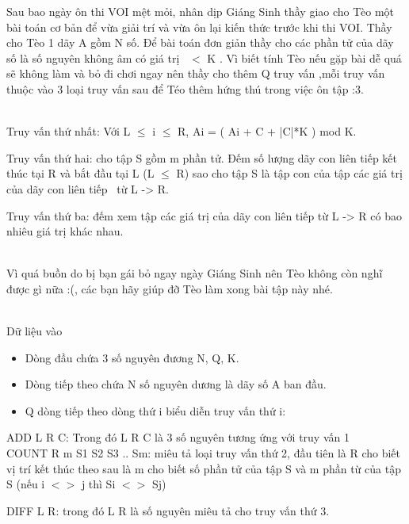 







     Sau bao ngày ôn thi VOI mệt mỏi, nhân dịp Giáng Sinh thầy giao cho Tèo một bài toán cơ bản để vừa giải trí và vừa ôn lại kiến thức trước khi thi VOI. Thầy cho Tèo 1 dãy A gồm N số. Để bài toán đơn giản thầy cho các phần tử của dãy số là số nguyên không âm có giá trị  $<$ K . Vì biết tính Tèo nếu gặp bài dễ quá sẽ không làm và bỏ đi chơi ngay nên thầy cho thêm Q truy vấn ,mỗi truy vấn thuộc vào 3 loại truy vấn sau để Téo thêm hứng thú trong việc ôn tập :3.    


\\

     Truy vấn thứ nhất: Với L  $\le$  i  $\le$  R, Ai = ( Ai + C + |C|*K ) mod K.    

     Truy vấn thứ hai: cho tập S gồm m phần tử. Đếm số lượng dãy con liên tiếp kết thúc tại R và bắt đầu tại L (L  $\le$  R) sao cho tập S là tập con của tập các giá trị của dãy con liên tiếp  từ L -> R.    

     Truy vấn thứ ba: đếm xem tập các giá trị của dãy con liên tiếp từ L -> R có bao nhiêu giá trị khác nhau.    


\\

     Vì quá buồn do bị bạn gái bỏ ngay ngày Giáng Sinh nên Tèo không còn nghĩ được gì nữa :(, các bạn hãy giúp đỡ Tèo làm xong bài tập này nhé.    


\\

     Dữ liệu vào    
\begin{itemize}
	\item      Dòng đầu chứa 3 số nguyên đương N, Q, K.    
	\item      Dòng tiếp theo chứa N số nguyên dương là dãy số A ban đầu.    
	\item      Q dòng tiếp theo dòng thứ i biểu diễn truy vấn thứ i:    
\end{itemize}

     ADD L R C: Trong đó L R C là 3 số nguyên tương ứng với truy vấn 1     
\\     COUNT R m S1 S2 S3 .. Sm: miêu tả loại truy vấn thứ 2, đầu tiên là R cho biết vị trí kết thúc theo sau là m cho biết số phần tử của tập S và m phần từ của tập S (nếu i $<$$>$ j thì Si $<$$>$ Sj)    

     DIFF L R: trong đó L R là số nguyên miêu tả cho truy vấn thứ 3.    


